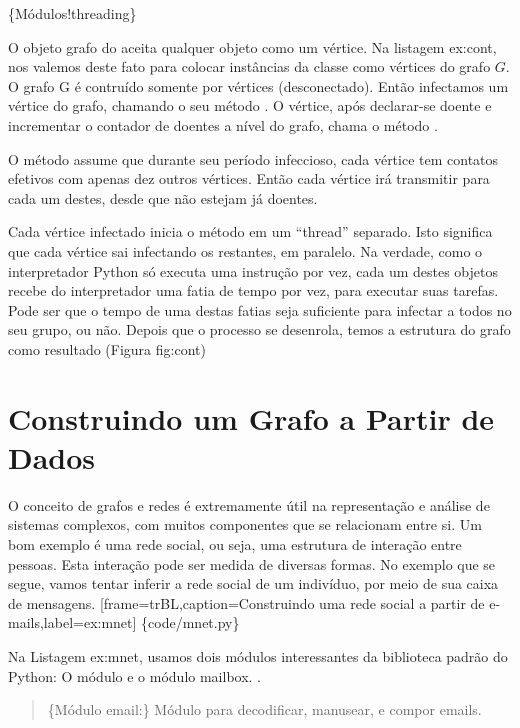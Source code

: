 \documentclass[a4paper,10pt,portuguese]{sphinxmanual}
\begin{document}
\{Módulos!threading\}

O objeto grafo do  aceita qualquer objeto como um
vértice. Na listagem ex:cont, nos valemos deste fato para colocar
instâncias da classe  como vértices do grafo
$G$. O grafo G é contruído somente por vértices
(desconectado). Então infectamos um vértice do grafo, chamando o
seu método . O vértice, após declarar-se doente e
incrementar o contador de doentes a nível do grafo, chama o método
.

O método  assume que durante seu período infeccioso,
cada vértice tem contatos efetivos com apenas dez outros vértices.
Então cada vértice irá transmitir para cada um destes, desde que
não estejam já doentes.

Cada vértice infectado inicia o método  em um ``thread''
separado. Isto significa que cada vértice sai infectando os
restantes, em paralelo. Na verdade, como o interpretador Python só
executa uma instrução por vez, cada um destes objetos recebe do
interpretador uma fatia de tempo por vez, para executar suas
tarefas. Pode ser que o tempo de uma destas fatias seja suficiente
para infectar a todos no seu grupo, ou não. Depois que o processo
se desenrola, temos a estrutura do grafo como resultado (Figura
fig:cont)


\section{Construindo um Grafo a Partir de Dados}
\label{capgraph:construindo-um-grafo-a-partir-de-dados}
O conceito de grafos e redes é extremamente útil na representação e
análise de sistemas complexos, com muitos componentes que se
relacionam entre si. Um bom exemplo é uma rede social, ou seja, uma
estrutura de interação entre pessoas. Esta interação pode ser
medida de diversas formas. No exemplo que se segue, vamos tentar
inferir a rede social de um indivíduo, por meio de sua caixa de
mensagens.
{[}frame=trBL,caption=Construindo uma rede social a partir de e-mails,label=ex:mnet{]} \{code/mnet.py\}

Na Listagem ex:mnet, usamos dois módulos interessantes da
biblioteca padrão do Python: O módulo  e o módulo mailbox.
.
\begin{quote}

\{Módulo email:\} Módulo para decodificar, manusear, e compor
emails.
\end{quote}
\end{document}
